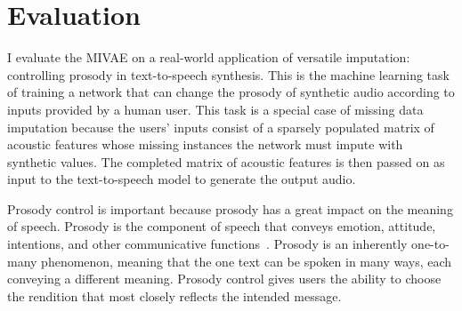 \documentclass[../thesis.tex]{subfiles}
\begin{document}





\section{Evaluation}
\label{sec:mivae-evaluation}

I evaluate the MIVAE on a real-world application of versatile imputation: controlling prosody in text-to-speech synthesis. This is the machine learning task of training a network that can change the prosody of synthetic audio according to inputs provided by a human user. This task is a special case of missing data imputation because the users' inputs consist of a sparsely populated matrix of acoustic features whose missing instances the network must impute with synthetic values. The completed matrix of acoustic features is then passed on as input to the text-to-speech model to generate the output audio. 

Prosody control is important because prosody has a great impact on the meaning of speech. Prosody is the component of speech that conveys emotion, attitude, intentions, and other communicative functions~\citep{hodariSynthesisingProsodyInsufficient2022}. Prosody is an inherently one-to-many phenomenon, meaning that the one text can be spoken in many ways, each conveying a different meaning. Prosody control gives users the ability to choose the rendition that most closely reflects the intended message. 
\end{document}
